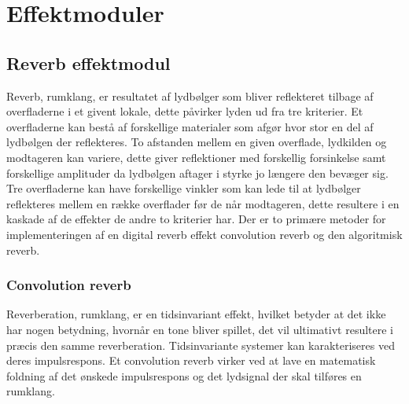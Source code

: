 \chapter{Effektmoduler}\label{chap:DSP}


\section{Reverb effektmodul}\label{sec:reverb}
Reverb, rumklang, er resultatet af lydbølger som bliver reflekteret tilbage af %
overfladerne i et givent lokale, dette påvirker lyden ud fra tre kriterier.\newline 
Et overfladerne kan bestå af forskellige materialer som afgør hvor stor en del af lydbølgen der reflekteres.\newline 
To afstanden mellem en given overflade, lydkilden og modtageren kan variere, dette giver reflektioner med forskellig forsinkelse samt forskellige amplituder da lydbølgen aftager i styrke jo længere den bevæger sig.\newline 
Tre overfladerne kan have forskellige vinkler som kan lede til at lydbølger reflekteres mellem en række overflader før de når modtageren, dette resultere i en kaskade af de effekter de andre to kriterier har.\newline
Der er to primære metoder for implementeringen af en digital reverb effekt convolution reverb og den algoritmisk reverb.
\subsection{Convolution reverb}
Reverberation, rumklang, er en tidsinvariant effekt, hvilket betyder at det ikke har nogen betydning, hvornår en tone bliver spillet, det vil ultimativt resultere i præcis den samme reverberation. \newline
Tidsinvariante systemer kan karakteriseres ved deres impulsrespons.
Et convolution reverb virker ved at lave en matematisk foldning af det ønskede %
impulsrespons og det lydsignal der skal tilføres en rumklang.\newline 

